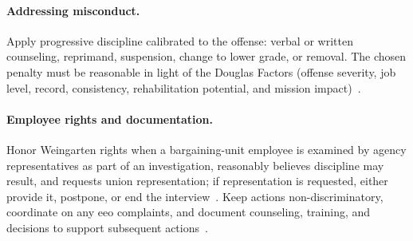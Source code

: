 \documentclass[../main.tex]{subfiles}
\begin{document}
\paragraph{Addressing misconduct.} Apply progressive discipline calibrated to the offense: verbal or written counseling, reprimand, suspension, change to lower grade, or removal. The chosen penalty must be reasonable in light of the Douglas Factors (offense severity, job level, record, consistency, rehabilitation potential, and mission impact)~\autocite{edo-6-1-4-employee-relations-2025,mspb-douglas-factors}.

\paragraph{Employee rights and documentation.} Honor Weingarten rights when a bargaining-unit employee is examined by agency representatives as part of an investigation, reasonably believes discipline may result, and requests union representation; if representation is requested, either provide it, postpone, or end the interview~\autocite{edo-6-1-5-labor-relations-2025,flra-7114-representation-rights}. Keep actions non-discriminatory, coordinate on any \ac{eeo} complaints, and document counseling, training, and decisions to support subsequent actions~\autocite{edo-6-1-3-eeo-2025,edo-6-1-4-employee-relations-2025,eeoc-federal-sector-process}.
\end{document}
